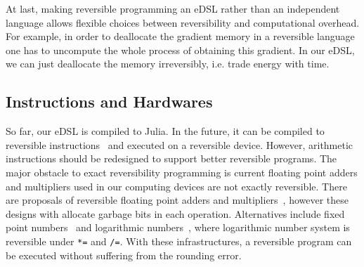 \documentclass[aps,twocolumn,longbibliography,english,superscriptaddress]{revtex4-1}
\newcommand{\<}{\langle}
\renewcommand{\>}{\rangle}
\theoremstyle{definition}\newtheorem{definition}{\textit{Definition}}
\begin{document}
At last, making reversible programming an eDSL rather than an independent language allows flexible choices between reversibility and computational overhead. For example, in order to deallocate the gradient memory in a reversible language one has to uncompute the whole process of obtaining this gradient.
In our eDSL, we can just deallocate the memory irreversibly, i.e. trade energy with time.



\subsection{Instructions and Hardwares}\label{sec:hardware}
So far, our eDSL is compiled to Julia.
In the future, it can be compiled to reversible instructions~\cite{Vieri1999} and executed on a reversible device.
However, arithmetic instructions should be redesigned to support better reversible programs.
The major obstacle to exact reversibility programming is current floating point adders and multipliers used in our computing devices are not exactly reversible.
There are proposals of reversible floating point adders and multipliers~\cite{Nachtigal2010,Nachtigal2011,Nguyen2013,Hner2018}, however these designs with allocate garbage bits in each operation.
Alternatives include fixed point numbers~\cite{FixedPointNumbers} and logarithmic numbers~\cite{Taylor1988,LogarithmicNumbers}, where logarithmic number system is reversible under \texttt{*=} and \texttt{/=}.
With these infrastructures, a reversible program can be executed without suffering from the rounding error.
\end{document}
